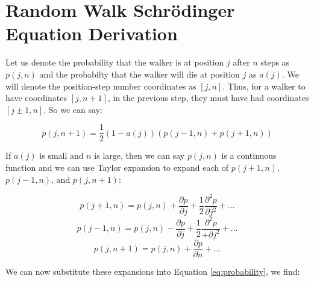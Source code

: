 \documentclass[journal]{IEEEtran}
\begin{document}
%



\appendices
\section{Random Walk Schr\"{o}dinger Equation Derivation}
\label{appendix:derivation}
Let us denote the probability that the walker is at position $j$ after $n$ steps
as $p(j,n)$ and the probabilty that the walker will die at position $j$ as
$a(j)$. We will denote the position-step number coordinates as $[j, n]$. Thus,
for a walker to have coordinates $[j, n+1]$, in the previous step, they must have
had coordinates $[j \pm 1, n]$. So we can say:

\begin{equation}
  \label{eq:probability}
  p(j, n+1) =  \frac{1}{2}(1-a(j))(p(j-1,n) + p(j+1,n))
\end{equation}

If $a(j)$ is small and $n$ is large, then we can say $p(j, n)$ is a continuous
function and we can use Taylor expansion to expand each of $p(j+1, n)$,
$p(j-1,n)$, and $p(j, n+1)$:

\begin{equation}
  p(j+1, n) = p(j,n) + \frac{\partial p}{\partial j} + \frac{1}{2}
  \frac{\partial^2 p}{\partial j^2} + ...
  \nonumber
\end{equation}
\begin{equation}
  p(j-1, n) = p(j,n) - \frac{\partial p}{\partial j} + \frac{1}{2}
  \frac{\partial^2 p}{+\partial j^2} + ...
  \nonumber
\end{equation}
\begin{equation}
  p(j, n+1) = p(j, n) + \frac{\partial p}{\partial n} + ...
  \nonumber
\end{equation}

We can now substitute these expansions into Equation \ref{eq:probability}, we
find:
\end{document}
